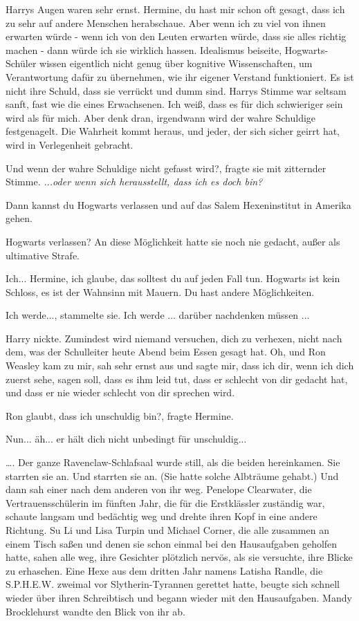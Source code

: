Harrys Augen waren sehr ernst. \glqq{}Hermine, du hast mir schon oft gesagt, dass
ich zu sehr auf andere Menschen herabschaue. Aber wenn ich zu viel von ihnen
erwarten würde - wenn ich von den Leuten erwarten würde, dass sie alles richtig
machen - dann würde ich sie wirklich hassen. Idealismus beiseite,
Hogwarts-Schüler wissen eigentlich nicht genug über kognitive Wissenschaften, um
Verantwortung dafür zu übernehmen, wie ihr eigener Verstand funktioniert. Es ist
nicht ihre Schuld, dass sie verrückt und dumm sind.\grqq{} Harrys Stimme war
seltsam sanft, fast wie die eines Erwachsenen. \glqq{}Ich weiß, dass es für dich
schwieriger sein wird als für mich. Aber denk dran, irgendwann wird der wahre
Schuldige festgenagelt. Die Wahrheit kommt heraus, und jeder, der sich sicher
geirrt hat, wird in Verlegenheit gebracht.\grqq{}

\glqq{}Und wenn der wahre Schuldige nicht gefasst wird?\grqq{}, fragte sie mit
zitternder Stimme. \emph{...oder wenn sich herausstellt, dass ich es doch bin?}

\glqq{}Dann kannst du Hogwarts verlassen und auf das Salem Hexeninstitut in
Amerika gehen.\grqq{}

\glqq{}Hogwarts verlassen?\grqq{} An diese Möglichkeit hatte sie noch nie
gedacht, außer als ultimative Strafe.

\glqq{}Ich... Hermine, ich glaube, das solltest du auf jeden Fall tun. Hogwarts
ist kein Schloss, es ist der Wahnsinn mit Mauern. Du hast andere
Möglichkeiten.\grqq{}

\glqq{}Ich werde...\grqq{}, stammelte sie. \glqq{}Ich werde ... darüber nachdenken
müssen ...\grqq{}

Harry nickte. \glqq{}Zumindest wird niemand versuchen, dich zu verhexen, nicht
nach dem, was der Schulleiter heute Abend beim Essen gesagt hat. Oh, und Ron
Weasley kam zu mir, sah sehr ernst aus und sagte mir, dass ich dir, wenn ich
dich zuerst sehe, sagen soll, dass es ihm leid tut, dass er schlecht von dir
gedacht hat, und dass er nie wieder schlecht von dir sprechen wird.\grqq{}

\glqq{}Ron glaubt, dass ich unschuldig bin?\grqq{}, fragte Hermine.

\glqq{}Nun... äh... er hält dich nicht unbedingt für unschuldig...\grqq{}

…. Der ganze Ravenclaw-Schlafsaal wurde still, als die beiden hereinkamen. Sie
starrten sie an. Und starrten sie an. (Sie hatte solche Albträume gehabt.) Und
dann sah einer nach dem anderen von ihr weg. Penelope Clearwater, die
Vertrauensschülerin im fünften Jahr, die für die Erstklässler zuständig war,
schaute langsam und bedächtig weg und drehte ihren Kopf in eine andere Richtung.
Su Li und Lisa Turpin und Michael Corner, die alle zusammen an einem Tisch saßen
und denen sie schon einmal bei den Hausaufgaben geholfen hatte, sahen alle weg,
ihre Gesichter plötzlich nervös, als sie versuchte, ihre Blicke zu erhaschen.
Eine Hexe aus dem dritten Jahr namens Latisha Randle, die S.P.H.E.W. zweimal vor
Slytherin-Tyrannen gerettet hatte, beugte sich schnell wieder über ihren
Schreibtisch und begann wieder mit den Hausaufgaben. Mandy Brocklehurst wandte
den Blick von ihr ab.

